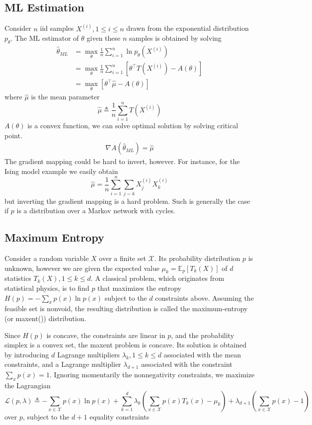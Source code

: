 \documentclass[11pt,a4paper]{article}
\begin{document}
\subsection{ML Estimation}
Consider $n$ iid samples $X^{(i)}, 1 \leq i \leq n$ drawn from the exponential distribution $p_\theta$. The ML estimator of $\theta$ given these $n$ samples is obtained by solving
$$
\begin{aligned}
\hat{\theta}_{ML}&=\max _\theta \frac{1}{n} \sum_{i=1}^n \ln p_\theta\left(X^{(i)}\right)\\
&=\max _\theta \frac{1}{n} \sum_{i=1}^n\left[\theta^{\top} T\left(X^{(i)}\right)-A(\theta)\right] \\
&=\max _\theta\left[\theta^{\top} \hat{\mu}-A(\theta)\right]
\end{aligned}
$$
where $\hat{\mu}$ is the mean parameter
$$
\hat{\mu} \triangleq \frac{1}{n} \sum_{i=1}^n T\left(X^{(i)}\right)
$$
$A(\theta)$ is a convex function, we can solve optimal solution by solving critical point.
\begin{equation}
    \begin{aligned}
        \nabla A(\hat{\theta}_{ML})=\hat{\mu}
    \end{aligned}
    \nonumber
\end{equation}
The gradient mapping could be hard to invert, however. For instance, for the Ising model example we easily obtain
$$
\hat{\mu}=\frac{1}{n} \sum_{i=1}^n \sum_{j \sim k} X_j^{(i)} X_k^{(i)}
$$
but inverting the gradient mapping is a hard problem. Such is generally the case if $p$ is a distribution over a Markov network with cycles.

\subsection{Maximum Entropy}
Consider a random variable $X$ over a finite set $\mathcal{X}$. Its probability distribution $p$ is unknown, however we are given the expected value $\mu_k=\mathbb{E}_p\left[T_k(X)\right]$ of $d$ statistics $T_k(X), 1 \leq k \leq d$. A classical problem, which originates from statistical physics, is to find $p$ that maximizes the entropy $H(p)=-\sum_x p(x) \ln p(x)$ subject to the $d$ constraints above. Assuming the feasible set is nonvoid, the resulting distribution is called the maximum-entropy (or maxent()) distribution.

Since $H(p)$ is concave, the constraints are linear in $p$, and the probability simplex is a convex set, the maxent problem is concave. Its solution is obtained by introducing $d$ Lagrange multipliers $\lambda_k, 1 \leq k \leq d$ associated with the mean constraints, and a Lagrange multiplier $\lambda_{d+1}$ associated with the constraint $\sum_x p(x)=1$. Ignoring momentarily the nonnegativity constraints, we maximize the Lagrangian
$$
\mathcal{L}(p, \lambda) \triangleq-\sum_{x \in \mathcal{X}} p(x) \ln p(x)+\sum_{k=1}^d \lambda_k\left(\sum_{x \in \mathcal{X}} p(x) T_k(x)-\mu_k\right)+\lambda_{d+1}\left(\sum_{x \in \mathcal{X}} p(x)-1\right)
$$
over $p$, subject to the $d+1$ equality constraints
\end{document}
